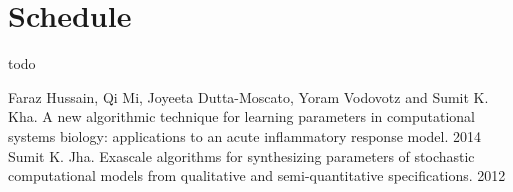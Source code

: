 \documentclass[a4paper,10pt]{article}
\begin{document}
\section*{Schedule}

todo

\begin{thebibliography}{9}

Faraz Hussain, Qi Mi, Joyeeta Dutta-Moscato, Yoram Vodovotz and Sumit K. Kha.
A new algorithmic technique for learning parameters in computational systems biology: applications to an acute
inflammatory response model. 2014
Sumit K. Jha. Exascale algorithms for synthesizing parameters of stochastic computational models from qualitative and semi-quantitative specifications. 2012


\end{thebibliography}
\end{document}
